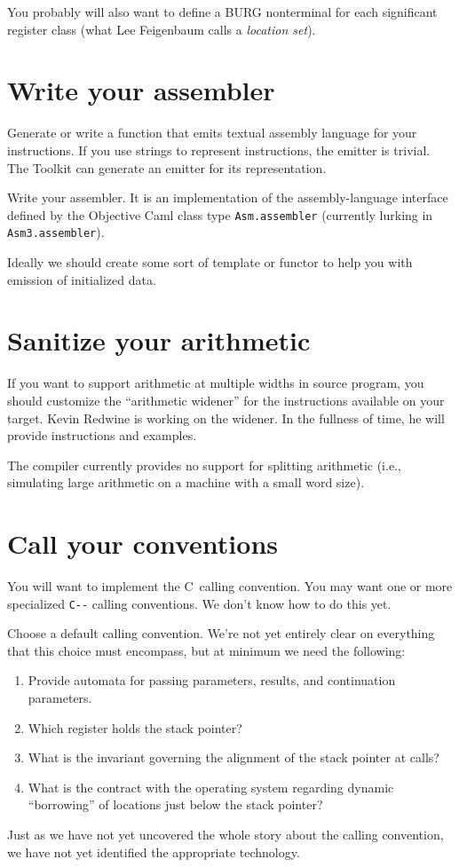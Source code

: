 \documentclass[12pt]{article}
\newcommand\PAL{\texttt{C-{}-}}
\begin{document}
You probably will also want to define a BURG nonterminal for each
significant register class (what Lee Feigenbaum calls a \emph{location
set}). 

\section{Write your assembler}

Generate or write a function that emits textual assembly language for
your instructions.
If you use strings to represent instructions, the emitter is trivial.
The Toolkit can generate an emitter for its representation.

Write your assembler.
It is an implementation of the assembly-language interface defined by
the Objective Caml class type 
\texttt{Asm.assembler} (currently lurking in \texttt{Asm3.assembler}).

Ideally we should create some sort of template or functor to help you
with emission of initialized data.


\section{Sanitize your arithmetic}

If you want to support arithmetic at multiple widths in source
program, you should customize the ``arithmetic widener'' for the
instructions available on 
your target.
Kevin Redwine is working on the widener.
In the fullness of time, he will provide instructions and
examples.

The compiler currently provides no support for splitting arithmetic
(i.e., simulating large arithmetic on a machine with a small word size).

\section{Call your conventions}

You will want to implement the C~calling convention.
You may want one
or more specialized {\PAL} calling conventions.
We don't know how to do this yet.

Choose a default calling convention.
We're not yet entirely clear on everything that this choice must
encompass, but at minimum we need the following:
\begin{enumerate}
\item
Provide automata for passing parameters, results, and continuation parameters.
\item
Which register holds the stack pointer?
\item
What is the invariant governing the alignment of the stack pointer at
calls?
\item
What is the contract with the operating system regarding dynamic
``borrowing'' of locations just below the stack pointer?
\end{enumerate}
Just as we have not yet uncovered the whole story about the calling
convention, we have not yet identified the appropriate technology.
\end{document}

